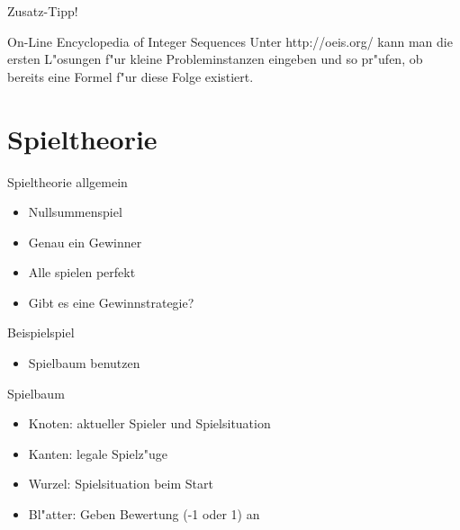 \documentclass[18pt]{beamer}
\begin{document}
\begin{frame}{Zusatz-Tipp!}
\begin{block}{On-Line Encyclopedia of Integer Sequences}
Unter http://oeis.org/ kann man die ersten L"osungen f"ur kleine Probleminstanzen eingeben und so pr"ufen, ob bereits eine Formel f"ur diese Folge existiert.
\end{block}

\end{frame}


\section{Spieltheorie}
\begin{frame}{Spieltheorie allgemein}
\begin{itemize}
\item Nullsummenspiel
\item Genau ein Gewinner
\item Alle spielen perfekt
\item Gibt es eine Gewinnstrategie?
\end{itemize}
\end{frame}

\begin{frame}{Beispielspiel}
\begin{itemize}
\begin{block}{simples Beispielspiel}
Alice und Bob haben sechs M"unzen in der Mitte liegen und nehmen abwechselnd je eine bis drei davon. Wer die letzte M"unze nimmt, gewinnt.
\end{block}
\item Spielbaum benutzen
\end{itemize}
\end{frame}

\begin{frame}{Spielbaum}
\begin{itemize}
\item Knoten: aktueller Spieler und Spielsituation
\item Kanten: legale Spielz"uge
\item Wurzel: Spielsituation beim Start
\item Bl"atter: Geben Bewertung (-1 oder 1) an
\end{itemize}
\end{frame}
\end{document}

